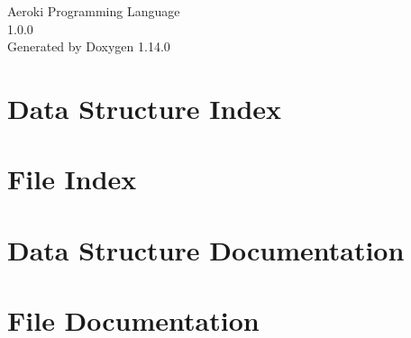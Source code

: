 \documentclass[twoside]{book}
\newcommand{\+}{\discretionary{\mbox{\scriptsize$\hookleftarrow$}}{}{}}
\newcommand{\clearemptydoublepage}{%
    \newpage{\pagestyle{empty}\cleardoublepage}%
  }
\begin{document}
  \raggedbottom
    \hypersetup{pageanchor=false,
                bookmarksnumbered=true,
                pdfencoding=unicode
               }
  \begin{titlepage}
  \vspace*{7cm}
  \begin{center}%
  {\Large Aeroki Programming Language}\\
  [1ex]\large 1.\+0.\+0 \\
  \vspace*{1cm}
  {\large Generated by Doxygen 1.14.0}\\
  \end{center}
  \end{titlepage}
  \clearemptydoublepage
  \tableofcontents
  \clearemptydoublepage
  \hypersetup{pageanchor=true}
\chapter{Data Structure Index}

\chapter{File Index}

\chapter{Data Structure Documentation}











\chapter{File Documentation}


















  \backmatter
  \newpage
  \clearemptydoublepage
  \printindex
\end{document}
